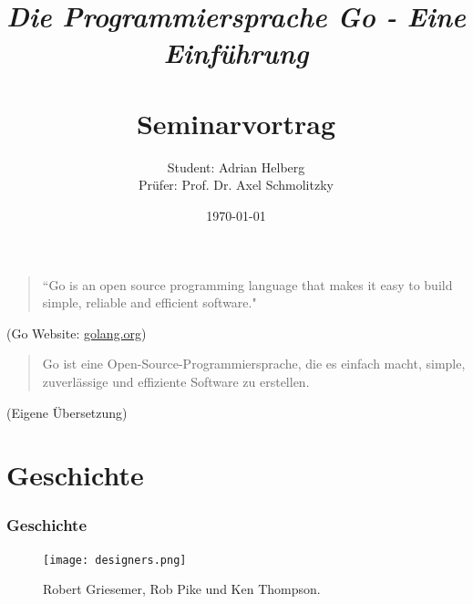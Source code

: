 \documentclass{beamer}
\title{
	\Large{\textit{\\Die Programmiersprache Go - Eine Einf\"uhrung}} \\
	\Large{\textbf{\\Seminarvortrag}}
}
\author{Student: Adrian Helberg \\Prüfer: Prof. Dr. Axel Schmolitzky}
\date{\today}
\begin{document}

\maketitle


\begin{frame}

\begin{quote}
``Go is an open source programming language that makes it easy to build simple, reliable and efficient software." 
\end{quote}

\begin{flushright}
\scriptsize (Go Website: \href{golang.org}{golang.org})
\end{flushright}

\begin{quote}
Go ist eine Open-Source-Programmiersprache, die es einfach macht, simple, zuverlässige und effiziente Software zu erstellen.
\end{quote}

\begin{flushright}
\scriptsize (Eigene \"Ubersetzung)
\end{flushright}

\end{frame}


\section{Geschichte}
\begin{frame}
\frametitle{Geschichte}

\centering
\begin{figure}
\texttt{[image: designers.png]}
\caption{Robert Griesemer, Rob Pike und Ken Thompson.}
\end{figure}

\end{frame}

\end{document}
